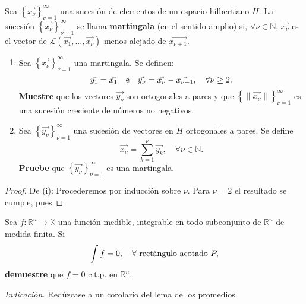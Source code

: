 \documentclass[12pt]{report}
\theoremstyle{largebreak}
\newcommand\cf[3]{\ensuremath{#1:#2\rightarrow#3}}
\newcommand\norm[1]{\ensuremath{\|#1\|}}
\begin{document}
    \begin{excer}
        Sea $\left\{\vec{x_\nu} \right\}_{\nu=1}^\infty$ una sucesión de elementos de un espacio hilbertiano $H$. La sucesión $\left\{\vec{x_\nu} \right\}_{\nu=1}^\infty$ se llama \textbf{martingala} (en el sentido amplio) si, $\forall\nu\in\mathbb{N}$, $\vec{x_\nu}$ es el vector de $\mathcal{L}(\vec{x_1},...,\vec{x_\nu})$ menos alejado de $\vec{x_{\nu+1}}$.
        \begin{enumerate}
            \item Sea $\left\{\vec{x_\nu} \right\}_{\nu=1}^\infty$ una martingala. Se definen:
            \begin{equation*}
                \vec{y_1}=\vec{x_1}\quad\textup{e}\quad\vec{y_\nu}=\vec{x_\nu}-\vec{x_{\nu-1}},\quad\forall\nu\geq2.
            \end{equation*}
            \textbf{Muestre} que los vectores $\vec{y_\nu}$ son ortogonales a pares y que $\left\{\norm{\vec{x_\nu}} \right\}_{\nu=1}^\infty$ es una sucesión creciente de números no negativos.
            \item Sea $\left\{\vec{y_\nu} \right\}_{\nu=1}^\infty$ una sucesión de vectores en $H$ ortogonales a pares. Se define
            \begin{equation*}
                \vec{x_\nu}=\sum_{k=1}^\nu\vec{y_k},\quad\forall\nu\in\mathbb{N}.
            \end{equation*}
            \textbf{Pruebe} que $\left\{\vec{y_\nu} \right\}_{\nu=1}^\infty$ es una martingala.
        \end{enumerate}
    \end{excer}

    \begin{proof}
        De (i): Procederemos por inducción sobre $\nu$. Para $\nu=2$ el resultado se cumple, pues
    \end{proof}

    \begin{excer}
        Sea $\cf{f}{\mathbb{R}^n}{\mathbb{K}}$ una función medible, integrable en todo subconjunto de $\mathbb{R}^n$ de medida finita. Si
        \begin{equation*}
            \int f=0,\quad\forall\textup{ rectángulo acotado }P,
        \end{equation*}
        \textbf{demuestre} que $f=0$ c.t.p. en $\mathbb{R}^n$.
        
        \textit{Indicación.} Redúzcase a un corolario del lema de los promedios.
    \end{excer}
\end{document}
